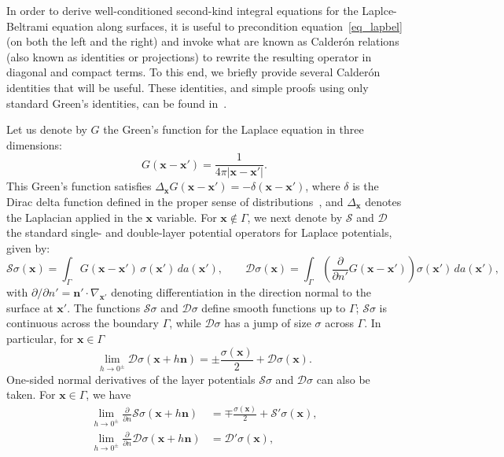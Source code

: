 \documentclass[11pt]{article}
\newcommand{\bn}{\bm n}
\newcommand{\bx}{\bm x}
\newcommand{\cS}{\mathcal S}
\newcommand{\cD}{\mathcal D}
\numberwithin{equation}{section}
\begin{document}
In order to derive well-conditioned second-kind integral equations for
the Laplce-Beltrami equation along surfaces, it is useful to
precondition equation~\eqref{eq_lapbel} (on both the left and the
right)
and invoke what are known as Calder\'on relations (also known as
identities or projections) to rewrite the resulting operator in 
diagonal and compact terms.
To this end, we briefly provide several Calder\'on identities that
will be useful. These identities, and simple proofs using only
standard Green's identities, can be found in~\cite{nedelec}.

Let us denote by $G$ the Green's function for the Laplace equation in
three dimensions:
\begin{equation}
G(\bx-\bx') = \frac{1}{4\pi |\bx - \bx'|}.
  \end{equation}
This Green's function satisfies $\Delta_{\bx} G(\bx-\bx') =
-\delta(\bx-\bx')$, where $\delta$ is the Dirac delta function defined
in the proper sense of distributions~\cite{folland_1995}, and
$\Delta_{\bx}$ denotes the Laplacian applied in the $\bx$ variable.
For $\bx \notin \Gamma$, we next denote by
$\cS$ and $\cD$ the standard single- and double-layer
potential operators 
for Laplace potentials, given by:
\begin{equation}\label{eq_singdoub}
\cS\sigma(\bx) = \int_\Gamma G(\bx-\bx') \, \sigma(\bx')
\, da(\bx'), 
\qquad  \cD\sigma(\bx) = \int_\Gamma \left( \frac{\partial }{\partial n'}
G(\bx-\bx') \right)  \sigma(\bx') \, da(\bx'),
\end{equation}
with $\partial/\partial n' = \bn' \cdot \nabla_{\bx'}$
denoting differentiation in the direction
normal to the surface at $\bx'$.
The functions $\cS \sigma$ and $\cD \sigma$ define smooth functions up
to $\Gamma$; $\cS\sigma$ is continuous across the boundary $\Gamma$,
while $\cD\sigma$ has a jump of size $\sigma$ across $\Gamma$. In
particular, for $\bx \in \Gamma$
\begin{equation}
    \lim_{h \to 0^\pm} \cD\sigma (\bx + h\bn) = \pm \frac{\sigma(\bx)}{2}
    + \cD\sigma(\bx).
\end{equation}
One-sided normal derivatives of the layer potentials $\cS\sigma$ and
$\cD\sigma$ can also be taken. For $\bx \in \Gamma$, we have
\begin{equation}
  \begin{aligned}
  \lim_{h \to 0^\pm} \frac{\partial}{\partial n}
     \cS\sigma (\bx + h\bn) &= \mp \frac{\sigma(\bx)}{2}
    + \cS'\sigma(\bx), \\
  \lim_{h \to 0^\pm} \frac{\partial}{\partial n}
     \cD\sigma (\bx + h\bn) &= \cD'\sigma(\bx),
  \end{aligned}
\end{equation}
\end{document}
